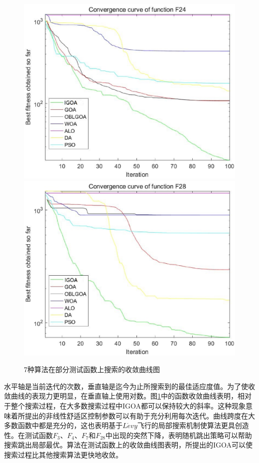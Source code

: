 \begin{figure}[ht]
    \centering
    \includegraphics[width=.5\linewidth]{function_F24.eps}\hfill
    \includegraphics[width=.5\linewidth]{function_F28.eps}\hfill\\[0.5cm]

  \caption{7种算法在部分测试函数上搜索的收敛曲线图}
  \label{fig:IGOA_convergence_curve}
  \end{figure}


水平轴是当前迭代的次数，垂直轴是迄今为止所搜索到的最佳适应度值。为了使收敛曲线的表现力更明显，在垂直轴上使用对数。图\ref{fig:IGOA_convergence_curve}中的函数收敛曲线表明，相对于整个搜索过程，在大多数搜索过程中IGOA都可以保持较大的斜率。这种现象意味着所提出的非线性舒适区控制参数可以有助于充分利用每次迭代。曲线跨度在大多数函数中都是充分的，这也表明基于$L\acute{e}vy$飞行的局部搜索机制使算法更具创造性。在测试函数$F_3$、$F_4$、$F_7$和$F_{28}$中出现的突然下降，表明随机跳出策略可以帮助搜索跳出局部最优。算法在测试函数上的收敛曲线图表明，所提出的IGOA可以使搜索过程比其他搜索算法更快地收敛。

